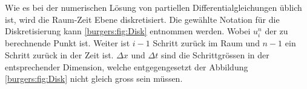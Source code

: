      Wie es bei der numerischen L\"osung von partiellen Differentialgleichungen \"ublich ist, wird die Raum-Zeit Ebene  diskretisiert.
     Die gew\"ahlte Notation f\"ur die Diskretisierung kann \ref{burgers:fig:Disk} entnommen werden.
     Wobei $u_i^n$ der zu berechnende Punkt ist.
     Weiter ist $i-1$ Schritt zur\"uck im Raum und $n-1$ ein Schritt zur\"uck in der Zeit ist.
     $\Delta x$ und $\Delta t$ sind die Schrittgr\"ossen in der entsprechender Dimension, welche entgegengesetzt der Abbildung \ref{burgers:fig:Disk} nicht gleich gross sein m\"ussen.
     